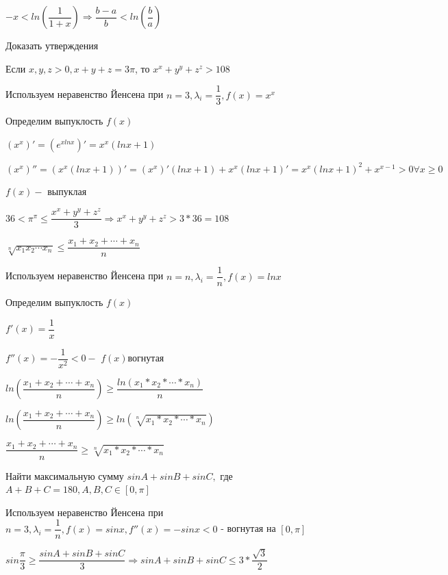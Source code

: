 \documentclass[12pt, a4paper]{article}
\begin{document}
$-x < ln(\dfrac{1}{1 + x}) \Rightarrow \dfrac{b - a}{b} < ln(\dfrac{b}{a})$

\p Доказать утверждения 

\sp Если $x, y, z > 0, x + y + z = 3\pi$, то $x^x + y^y + z^z > 108$

Используем неравенство Йенсена при $n = 3, \lambda_i = \dfrac{1}{3}, f(x) = x^x$

Определим выпуклость $f(x)$

$(x^x)' = (e^{xlnx})' = x^x (lnx + 1)$

$(x^x)'' = (x^x (lnx + 1))' = (x^x)'(lnx + 1) + x^x(lnx + 1)' = x^x(lnx + 1)^2 + x^{x - 1} > 0 \forall x \geq 0$

$f(x) -$ выпуклая

$36 < \pi^\pi \leq \dfrac{x^x + y^y + z^z}{3} \Rightarrow x^x + y^y + z^z> 3 * 36 = 108$

\sp $\sqrt[n]{x_1x_2\cdots x_n} \leq \dfrac{x_1 + x_2 + \cdots + x_n}{n}$

Используем неравенство Йенсена при $n = n, \lambda_i = \dfrac{1}{n}, f(x) = lnx$

Определим выпуклость $f(x)$

$f'(x) = \dfrac{1}{x}$

$f''(x) = -\dfrac{1}{x^2} < 0 - $ $f(x) $вогнутая

$ln(\dfrac{x_1 + x_2 + \cdots + x_n}{n}) \geq \dfrac{ln(x_1*x_2*\cdots*x_n)}{n}$

$ln(\dfrac{x_1 + x_2 + \cdots + x_n}{n}) \geq ln(\sqrt[n]{x_1*x_2*\cdots*x_n})$

$\dfrac{x_1 + x_2 + \cdots + x_n}{n} \geq \sqrt[n]{x_1*x_2*\cdots*x_n}$


\p Найти максимальную сумму $sinA + sinB + sinC,$ где $A + B + C = 180, A, B, C \in [0, \pi]$

Используем неравенство Йенсена при $n = 3, \lambda_i = \dfrac{1}{n}, f(x) = sinx, f''(x) = -sinx < 0 $ - вогнутая на $[0, \pi]$

$sin\dfrac{\pi}{3} \geq \dfrac{sinA + sinB + sinC}{3} \Rightarrow sinA + sinB + sinC \leq 3 * \dfrac{\sqrt{3}}{2}$
\end{document}
